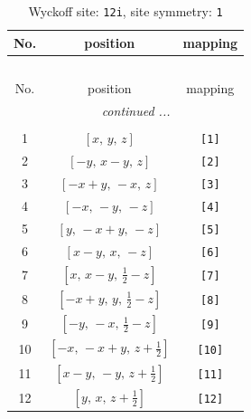 \documentclass[fleqn,8pt]{jsarticle}
\begin{document}
\renewcommand{\arraystretch}{1.2}
\begin{longtable}{ccc}
\caption{Wyckoff site: {\tt 12i}, site symmetry: {\tt 1}}
 \\
 \hline \hline
No. & position & mapping \\ \hline \endfirsthead

\multicolumn{2}{l}{\tablename\ \thetable{}} \\
 \hline \hline
No. & position & mapping \\ \hline \endhead

 \hline \hline
\multicolumn{2}{r}{\footnotesize\it continued ...} \\ \endfoot

 \hline \hline
\multicolumn{2}{r}{} \\ \endlastfoot

1 & $\left[ x,\, y,\, z \right]$ & {\tt [1]} \\ \hline
2 & $\left[ - y,\, x - y,\, z \right]$ & {\tt [2]} \\ \hline
3 & $\left[ - x + y,\, - x,\, z \right]$ & {\tt [3]} \\ \hline
4 & $\left[ - x,\, - y,\, - z \right]$ & {\tt [4]} \\ \hline
5 & $\left[ y,\, - x + y,\, - z \right]$ & {\tt [5]} \\ \hline
6 & $\left[ x - y,\, x,\, - z \right]$ & {\tt [6]} \\ \hline
7 & $\left[ x,\, x - y,\, \frac{1}{2} - z \right]$ & {\tt [7]} \\ \hline
8 & $\left[ - x + y,\, y,\, \frac{1}{2} - z \right]$ & {\tt [8]} \\ \hline
9 & $\left[ - y,\, - x,\, \frac{1}{2} - z \right]$ & {\tt [9]} \\ \hline
10 & $\left[ - x,\, - x + y,\, z + \frac{1}{2} \right]$ & {\tt [10]} \\ \hline
11 & $\left[ x - y,\, - y,\, z + \frac{1}{2} \right]$ & {\tt [11]} \\ \hline
12 & $\left[ y,\, x,\, z + \frac{1}{2} \right]$ & {\tt [12]} \\
\end{longtable}
\end{document}
